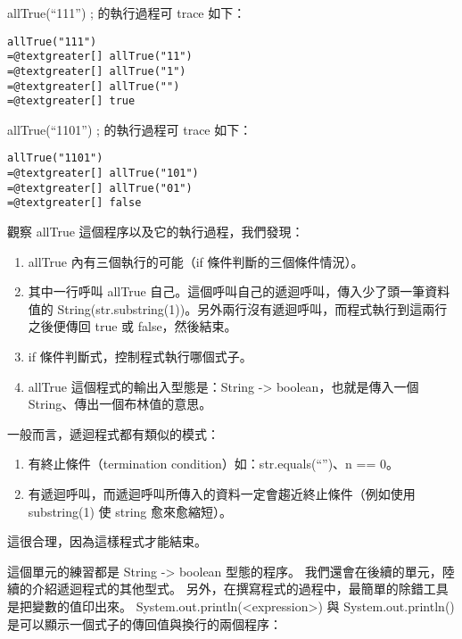 \documentclass[a4paper,12pt,english]{sphinxmanual}
\begin{document}
allTrue(``111'') ; 的執行過程可 trace 如下：

\begin{Verbatim}[commandchars=@\[\]]
   allTrue("111")
=@textgreater[] allTrue("11")
=@textgreater[] allTrue("1")
=@textgreater[] allTrue("")
=@textgreater[] true
\end{Verbatim}

allTrue(``1101'') ; 的執行過程可 trace 如下：

\begin{Verbatim}[commandchars=@\[\]]
   allTrue("1101")
=@textgreater[] allTrue("101")
=@textgreater[] allTrue("01")
=@textgreater[] false
\end{Verbatim}

觀察 allTrue 這個程序以及它的執行過程，我們發現：
\begin{enumerate}
\item {} 
allTrue 內有三個執行的可能（if 條件判斷的三個條件情況）。

\item {} 
其中一行呼叫 allTrue 自己。這個呼叫自己的遞迴呼叫，傳入少了頭一筆資料值的 String(str.substring(1))。另外兩行沒有遞迴呼叫，而程式執行到這兩行之後便傳回 true 或 false，然後結束。

\item {} 
if 條件判斷式，控制程式執行哪個式子。

\item {} 
allTrue 這個程式的輸出入型態是：String -\textgreater{} boolean，也就是傳入一個 String、傳出一個布林值的意思。

\end{enumerate}

一般而言，遞迴程式都有類似的模式：
\begin{enumerate}
\item {} 
有終止條件（termination condition）如：str.equals(``'')、n == 0。

\item {} 
有遞迴呼叫，而遞迴呼叫所傳入的資料一定會趨近終止條件（例如使用 substring(1) 使 string 愈來愈縮短）。

\end{enumerate}

這很合理，因為這樣程式才能結束。

這個單元的練習都是 String -\textgreater{} boolean 型態的程序。
我們還會在後續的單元，陸續的介紹遞迴程式的其他型式。
另外，在撰寫程式的過程中，最簡單的除錯工具是把變數的值印出來。
System.out.println(\textless{}expression\textgreater{}) 與 System.out.println() 是可以顯示一個式子的傳回值與換行的兩個程序：
\end{document}
